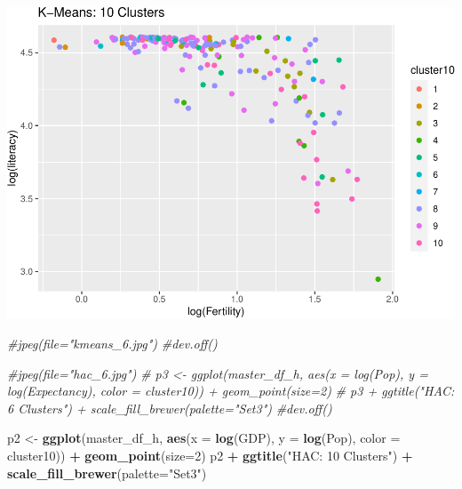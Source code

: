\documentclass[]{article}
\newenvironment{Shaded}{\begin{snugshade}}{\end{snugshade}}
\newcommand{\CommentTok}[1]{\textcolor[rgb]{0.56,0.35,0.01}{\textit{#1}}}
\newcommand{\DataTypeTok}[1]{\textcolor[rgb]{0.13,0.29,0.53}{#1}}
\newcommand{\DecValTok}[1]{\textcolor[rgb]{0.00,0.00,0.81}{#1}}
\newcommand{\KeywordTok}[1]{\textcolor[rgb]{0.13,0.29,0.53}{\textbf{#1}}}
\newcommand{\NormalTok}[1]{#1}
\newcommand{\OperatorTok}[1]{\textcolor[rgb]{0.81,0.36,0.00}{\textbf{#1}}}
\newcommand{\StringTok}[1]{\textcolor[rgb]{0.31,0.60,0.02}{#1}}
\begin{document}
\includegraphics{eda_files/figure-latex/unnamed-chunk-30-10.pdf}

\begin{Shaded}
\begin{Highlighting}[]
\CommentTok{#jpeg(file="kmeans_6.jpg")}
\CommentTok{#dev.off()}

\CommentTok{#jpeg(file="hac_6.jpg")}
\CommentTok{# p3 <- ggplot(master_df_h, aes(x = log(Pop), y = log(Expectancy), color = cluster10)) + geom_point(size=2) }
\CommentTok{# p3 + ggtitle("HAC: 6 Clusters") + scale_fill_brewer(palette="Set3")}
\CommentTok{#dev.off()}
\end{Highlighting}
\end{Shaded}

\begin{Shaded}
\begin{Highlighting}[]
\NormalTok{p2 <-}\StringTok{ }\KeywordTok{ggplot}\NormalTok{(master_df_h, }\KeywordTok{aes}\NormalTok{(}\DataTypeTok{x =} \KeywordTok{log}\NormalTok{(GDP), }\DataTypeTok{y =} \KeywordTok{log}\NormalTok{(Pop), }\DataTypeTok{color =}\NormalTok{ cluster10)) }\OperatorTok{+}
\StringTok{  }\KeywordTok{geom_point}\NormalTok{(}\DataTypeTok{size=}\DecValTok{2}\NormalTok{)}
\NormalTok{p2 }\OperatorTok{+}\StringTok{ }\KeywordTok{ggtitle}\NormalTok{(}\StringTok{"HAC: 10 Clusters"}\NormalTok{) }\OperatorTok{+}\StringTok{ }\KeywordTok{scale_fill_brewer}\NormalTok{(}\DataTypeTok{palette=}\StringTok{"Set3"}\NormalTok{)}
\end{Highlighting}
\end{Shaded}
\end{document}
